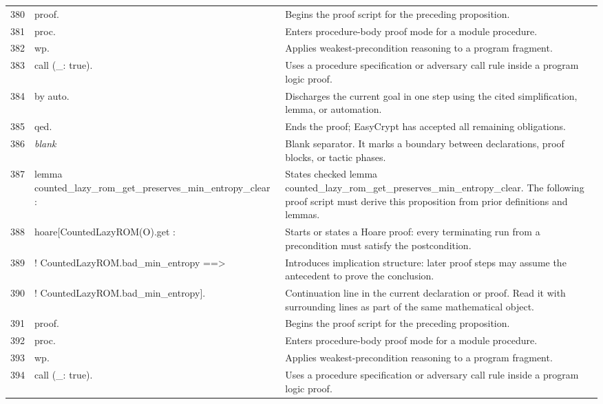 \documentclass[10pt]{article}
\begin{document}
\begin{longtable}{r L{0.53\textwidth} L{0.37\textwidth}}
380 & {\ttfamily\scriptsize proof.} & Begins the proof script for the preceding proposition. \\
381 & {\ttfamily\scriptsize proc.} & Enters procedure-body proof mode for a module procedure. \\
382 & {\ttfamily\scriptsize wp.} & Applies weakest-precondition reasoning to a program fragment. \\
383 & {\ttfamily\scriptsize call (\_: true).} & Uses a procedure specification or adversary call rule inside a program logic proof. \\
384 & {\ttfamily\scriptsize by auto.} & Discharges the current goal in one step using the cited simplification, lemma, or automation. \\
385 & {\ttfamily\scriptsize qed.} & Ends the proof; EasyCrypt has accepted all remaining obligations. \\
386 & {\ttfamily\scriptsize \emph{blank}} & Blank separator.  It marks a boundary between declarations, proof blocks, or tactic phases. \\
387 & {\ttfamily\scriptsize lemma counted\_lazy\_rom\_get\_preserves\_min\_entropy\_clear :} & States checked lemma counted\_lazy\_rom\_get\_preserves\_min\_entropy\_clear.  The following proof script must derive this proposition from prior definitions and lemmas. \\
388 & {\ttfamily\scriptsize   hoare[CountedLazyROM(O).get :} & Starts or states a Hoare proof: every terminating run from a precondition must satisfy the postcondition. \\
389 & {\ttfamily\scriptsize     ! CountedLazyROM.bad\_min\_entropy ==>} & Introduces implication structure: later proof steps may assume the antecedent to prove the conclusion. \\
390 & {\ttfamily\scriptsize     ! CountedLazyROM.bad\_min\_entropy].} & Continuation line in the current declaration or proof.  Read it with surrounding lines as part of the same mathematical object. \\
391 & {\ttfamily\scriptsize proof.} & Begins the proof script for the preceding proposition. \\
392 & {\ttfamily\scriptsize proc.} & Enters procedure-body proof mode for a module procedure. \\
393 & {\ttfamily\scriptsize wp.} & Applies weakest-precondition reasoning to a program fragment. \\
394 & {\ttfamily\scriptsize call (\_: true).} & Uses a procedure specification or adversary call rule inside a program logic proof. \\

\end{longtable}
\end{document}
